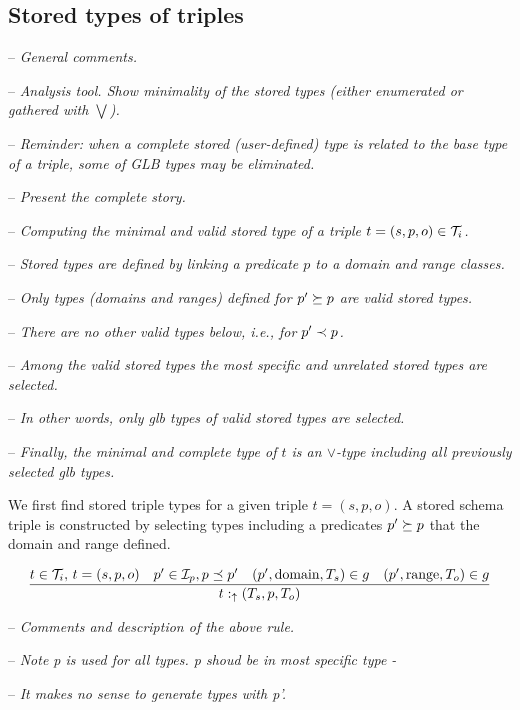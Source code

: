 \documentclass[runningheads]{llncs}
\newcommand{\uarr}{\uparrow}
\newcommand{\I}{{\cal I}}
\newcommand{\T}{{\cal T}}
\newcommand{\memo}[1]{}
\newcommand{\notes}[1]{\noindent\begin{small}-- \emph{#1}\\\end{small}}
\begin{document}
\memo{The types of $s$ and $o$ can be any classes $T_s$ and $T_o$ from
  ${\cal I}_c$, while the type of $p$ has to be a class $T_p$ that is
  a subclass of rdf:Property. The typing of a triple $t$ is correct
  since the interpretation of $T$ includes $t$.}

\memo{Moreover, the types $T$ that are derived by the above rule are
  minimal in the sense that given the information provided, i.e., the
  types of $t$'s components, their interpretations are minimal
  possible comparing them to the interpretations of all other derived
  types of $t$.}






\subsection{Stored types of triples}

\notes{General comments.}
\notes{Analysis tool. Show minimality of the stored types (either enumerated or gathered with $\bigvee$).}
\notes{\emph{Reminder:} when a complete stored (user-defined) type is related to the base type of a triple, some of GLB types may be eliminated.}

\notes{Present the complete story.}
\notes{Computing the minimal and valid stored type of a triple $t=(s,p,o)\in\T_i$.}
\notes{Stored types are defined by linking a predicate $p$ to a domain and range classes.}
\notes{Only types (domains and ranges) defined for $p'\succeq\/p$ are valid stored types.}
\notes{There are no other valid types below, i.e., for $p'\prec\/p$.}
\notes{Among the valid stored types the most specific and unrelated stored types are selected.}
\notes{In other words, only glb types of valid stored types are selected.}
\notes{Finally, the minimal and complete type of $t$ is an $\lor$-type including all previously selected glb types.}

We first find stored triple types for a given triple $t=(s,p,o)$. A
stored schema triple is constructed by selecting types including a
predicates $p'\succeq\/p$ that  the domain and range defined.

\begin{equation}
\label{rul:3-stored}
\dfrac{t\in\T_i,\, t=(s,p,o)\quad p'\in\I_p, p\preceq\/p'\quad (p',\text{domain},T_s)\in\/g\quad (p',\text{range},T_o)\in\/g}
      {t:_\uarr(T_s,p,T_o)}
\end{equation}


\medskip
\notes{Comments and description of the above rule.}
\notes{Note p is used for all types. p shoud be in most specific type -}
\notes{It makes no sense to generate types with p'.} 
\end{document}
